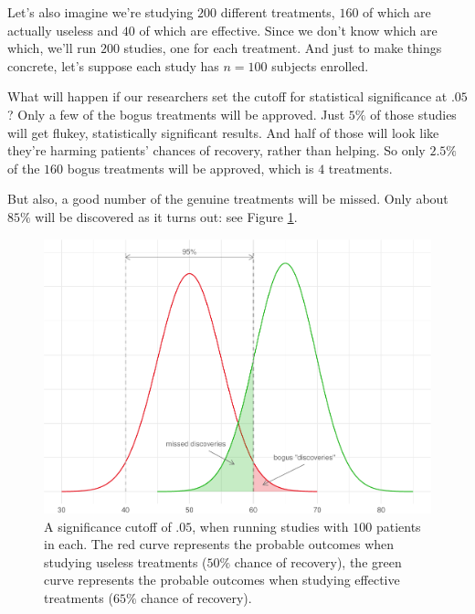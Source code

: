 \documentclass[justified]{tufte-book}
\theoremstyle{definition}
\theoremstyle{definition}
\theoremstyle{definition}
\theoremstyle{remark}
\begin{document}
Let's also imagine we're studying \(200\) different treatments, \(160\)
of which are actually useless and \(40\) of which are effective. Since
we don't know which are which, we'll run \(200\) studies, one for each
treatment. And just to make things concrete, let's suppose each study
has \(n = 100\) subjects enrolled.

What will happen if our researchers set the cutoff for statistical
significance at \(.05\)? Only a few of the bogus treatments will be
approved. Just \(5\%\) of those studies will get flukey, statistically
significant results. And half of those will look like they're harming
patients' chances of recovery, rather than helping. So only \(2.5\%\) of
the \(160\) bogus treatments will be approved, which is \(4\)
treatments.

But also, a good number of the genuine treatments will be missed. Only
about \(85\%\) will be discovered as it turns out: see Figure
\ref{fig:hundredstudies}.

\begin{figure}
\includegraphics{_main_files/figure-latex/hundredstudies-1} \caption[A significance cutoff of $.05$, when running studies with $100$ patients in each]{A significance cutoff of $.05$, when running studies with $100$ patients in each. The red curve represents the probable outcomes when studying useless treatments ($50\%$ chance of recovery), the green curve represents the probable outcomes when studying effective treatments ($65\%$ chance of recovery).}\label{fig:hundredstudies}
\end{figure}
\end{document}
